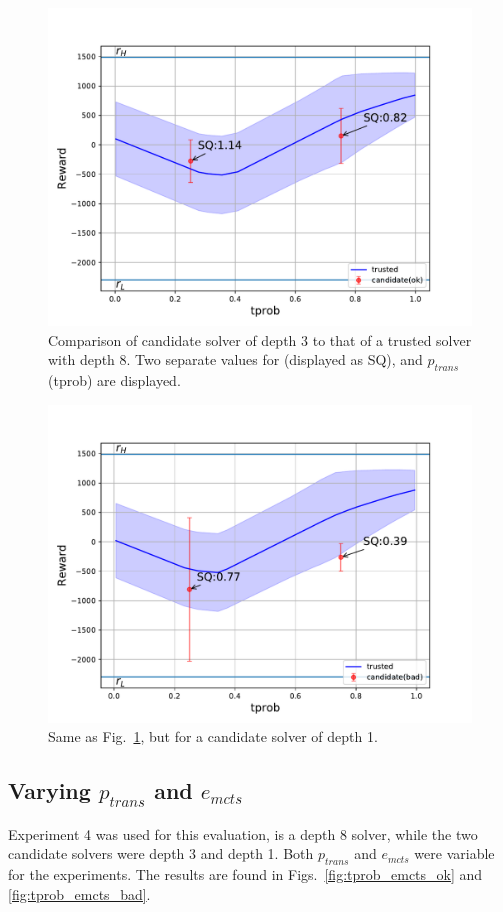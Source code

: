\begin{figure}[tbp]
    \centering
    \includegraphics[width=0.9\linewidth]{Figures/transition_vary_tprob_ok.pdf}
    \caption{Comparison of candidate solver of depth 3 to that of a trusted solver with depth 8. Two separate values for \xQ{} (displayed as SQ), and $p_{trans}$ (tprob) are displayed.}
    \label{fig:tprob_ok}
\end{figure}
\begin{figure}[tbp]
    \centering
    \includegraphics[width=0.9\linewidth]{Figures/transition_vary_tprob_bad.pdf}
    \caption{Same as Fig.~\ref{fig:tprob_ok}, but for a candidate solver of depth 1.}
    \label{fig:tprob_bad}
\end{figure}

\subsection{Varying $p_{trans}$ and $e_{mcts}$}
Experiment 4 was used for this evaluation, \solverstar{} is a depth 8 solver, while the two candidate solvers were depth 3 and depth 1. Both $p_{trans}$ and $e_{mcts}$ were variable for the experiments. The results are found in Figs.~\ref{fig:tprob_emcts_ok} and \ref{fig:tprob_emcts_bad}.

